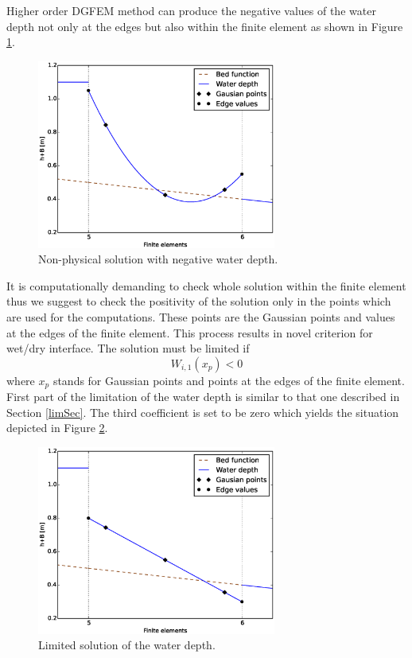 Higher order DGFEM method can produce the negative values of the water depth not only at the edges but also within the finite element as shown in Figure \ref{wetDry}.
\begin{figure}
\centering
\includegraphics[width=0.7\textwidth]{OBR/wetDry.eps}
\caption{Non-physical solution with negative water depth.}\label{wetDry}
\end{figure}
 It is computationally demanding to check whole solution within the finite element thus we suggest to check the positivity of the solution only in the points which are used for the computations. These points are the Gaussian points and values at the edges of the finite element. This process results in novel criterion for wet/dry interface. The solution must be limited if 
 \begin{equation}
 W_{i,1}(x_p)<0
 \end{equation}
where $x_p$ stands for Gaussian points and points at the edges of the finite element. First part of the limitation of the water depth is similar to that one described in Section \ref{limSec}. The third coefficient is set to be zero which yields the situation depicted in Figure \ref{lin}. 
\begin{figure}
\centering
\includegraphics[width=0.7\textwidth]{OBR/lin.eps}
\caption{Limited solution of the water depth.}\label{lin}
\end{figure}
